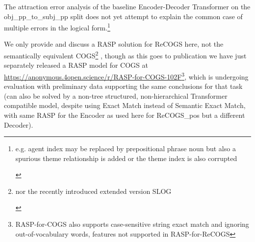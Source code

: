 \documentclass[11pt]{article}
\begin{document}
The attraction error analysis of the \cite{Wu2023} baseline Encoder-Decoder Transformer on the obj\_pp\_to\_subj\_pp split does not yet attempt to explain the common case of multiple errors in the logical form.\footnote{\begin{footnotesize}e.g. agent index may be replaced by prepositional phrase noun but also a spurious theme relationship is added or the theme index is also corrupted\end{footnotesize}}

We only provide and discuss a RASP solution for ReCOGS \cite{Wu2023} here, not the semantically equivalent COGS\footnote{\begin{footnotesize}nor the recently introduced extended version SLOG \cite{li2023slogstructuralgeneralizationbenchmark}\end{footnotesize}} \cite{KimLinzen2020}, though as this goes to publication we have just separately released a RASP model for COGS at \href{https://anonymous.4open.science/r/RASP-for-COGS-102F}{https://anonymous.4open.science/r/RASP-for-COGS-102F}\footnote{RASP-for-COGS also supports case-sensitive string exact match and ignoring out-of-vocabulary words, features not supported in RASP-for-ReCOGS}, which is undergoing evaluation with preliminary data supporting the same conclusions for that task (can also be solved by a non-tree structured, non-hierarchical Transformer compatible model, despite using Exact Match instead of Semantic Exact Match, with same RASP for the Encoder as used here for ReCOGS\_pos but a different Decoder).
\end{document}
